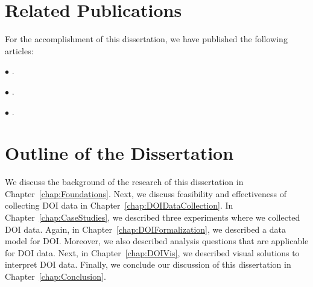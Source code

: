 \section{Related Publications}
For the accomplishment of this dissertation, we have published the following articles:

$\bullet$ .    

$\bullet$ .

$\bullet$ .

\section{Outline of the Dissertation}
We discuss the background of the research of this dissertation in Chapter~\ref{chap:Foundations}. Next, we discuss feasibility and effectiveness of collecting DOI data in Chapter~\ref{chap:DOIDataCollection}. In Chapter~\ref{chap:CaseStudies}, we described three experiments where we collected DOI data. Again, in Chapter~\ref{chap:DOIFormalization}, we described a data model for DOI. Moreover, we also described analysis questions that are applicable for DOI data. Next, in Chapter~\ref{chap:DOIVis}, we described visual solutions to interpret DOI data. Finally, we conclude our discussion of this dissertation in Chapter~\ref{chap:Conclusion}.
